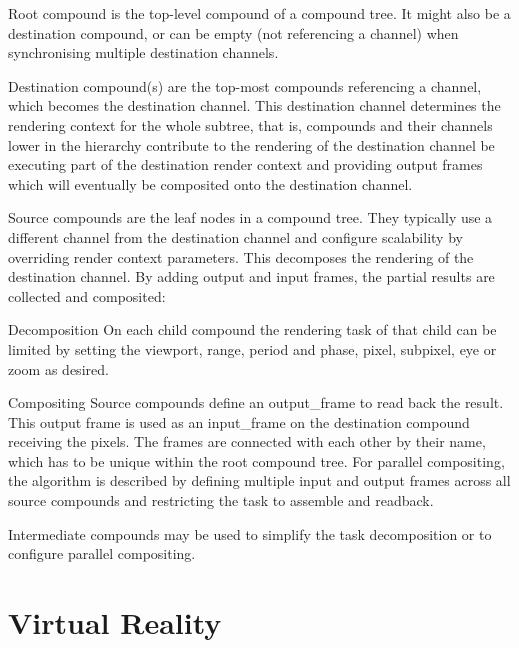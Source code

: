 \begin{compactdesc}
 \item [Root compound] is the top-level compound of a compound tree. It might
 also be a destination compound, or can be empty (not referencing a channel)
 when synchronising multiple destination channels.

\item [Destination compound(s)] are the top-most compounds referencing a
channel, which becomes the destination channel. This destination channel
determines the rendering context for the whole subtree, that is, compounds and
their channels lower in the hierarchy contribute to the rendering of the
destination channel be executing part of the destination render context and
providing output frames which will eventually be composited onto the
destination channel.

 \item [Source compounds] are the leaf nodes in a compound tree. They typically
 use a different channel from the destination channel and configure scalability
 by overriding render context parameters. This decomposes the rendering of the
 destination channel. By adding output and input frames, the partial results are
 collected and composited:
 \begin{compactdesc}
  \item[Decomposition] On each child compound the rendering task of that
  child can be limited by setting the \textsf{viewport}, \textsf{range},
  \textsf{period} and \textsf{phase}, \textsf{pixel}, \textsf{subpixel},
  \textsf{eye} or \textsf{zoom} as desired.

  \item[Compositing] Source compounds define an \textsf{output\_frame} to read
  back the result. This output frame is used as an \textsf{input\_frame} on the
  destination compound receiving the pixels. The frames are connected with each
  other by their name, which has to be unique within the root compound tree.
  For parallel compositing, the algorithm is described by defining multiple
  input and output frames across all source compounds and restricting the task
  to assemble and readback.

 \end{compactdesc}
 \item[Intermediate compounds] may be used to simplify the task decomposition or
 to configure parallel compositing.
\end{compactdesc}

\section{Virtual Reality}

